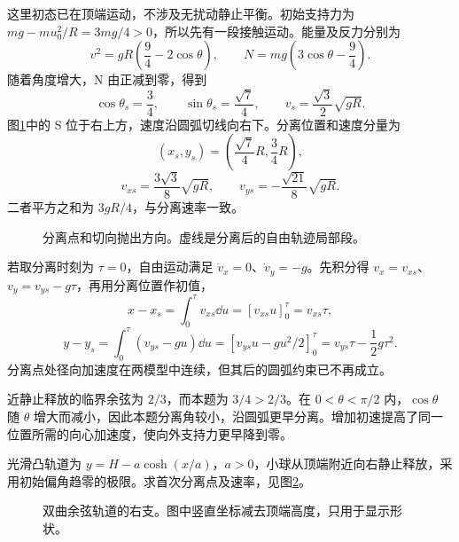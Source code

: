 \begin{solution}
这里初态已在顶端运动，不涉及无扰动静止平衡。初始支持力为 $mg-mu_0^2/R=3mg/4>0$，所以先有一段接触运动。能量及反力分别为
\[
v^2=gR\left(\frac94-2\cos\theta\right),\qquad
N=mg\left(3\cos\theta-\frac94\right).
\]
随着角度增大，N 由正减到零，得到
\[
\cos\theta_s=\frac34,\qquad
\sin\theta_s=\frac{\sqrt7}4,\qquad
v_s=\frac{\sqrt3}{2}\sqrt{gR}.
\]
图\ref{sup2:fig:d2-h1-s}中的 S 位于右上方，速度沿圆弧切线向右下。分离位置和速度分量为
\[
(x_s,y_s)=\left(\frac{\sqrt7}{4}R,\frac34R\right),
\]
\[
v_{xs}=\frac{3\sqrt3}{8}\sqrt{gR},\qquad
v_{ys}=-\frac{\sqrt{21}}8\sqrt{gR}.
\]
二者平方之和为 $3gR/4$，与分离速率一致。

\begin{figure}[H]\centering
{}
\caption{分离点和切向抛出方向。虚线是分离后的自由轨迹局部段。}\label{sup2:fig:d2-h1-s}
\end{figure}

若取分离时刻为 $\tau=0$，自由运动满足 $\dot v_x=0$、$\dot v_y=-g$。先积分得 $v_x=v_{xs}$、$v_y=v_{ys}-g\tau$，再用分离位置作初值，
\[
x-x_s=\int_0^\tau v_{xs}\dd u=[v_{xs}u]_0^\tau=v_{xs}\tau,
\]
\[
y-y_s=\int_0^\tau(v_{ys}-gu)\dd u
=[v_{ys}u-gu^2/2]_0^\tau=v_{ys}\tau-\frac12g\tau^2.
\]
分离点处径向加速度在两模型中连续，但其后的圆弧约束已不再成立。

近静止释放的临界余弦为 $2/3$，而本题为 $3/4>2/3$。在 $0<\theta<\pi/2$ 内，$\cos\theta$ 随 $\theta$ 增大而减小，因此本题分离角较小，沿圆弧更早分离。增加初速提高了同一位置所需的向心加速度，使向外支持力更早降到零。

\end{solution}


\begin{exercise}[曲率改变的双曲余弦轨道]\label{sup2:problem-exercise-3}\label{sup2:exercise:d2-h3}

光滑凸轨道为 $y=H-a\cosh(x/a)$，$a>0$，小球从顶端附近向右静止释放，采用初始偏角趋零的极限。求首次分离点及速率，见图\ref{sup2:fig:d2-h3-q}。

\end{exercise}
\begin{figure}[H]\centering
{}
\caption{双曲余弦轨道的右支。图中竖直坐标减去顶端高度，只用于显示形状。}\label{sup2:fig:d2-h3-q}
\end{figure}
\par\medskip

